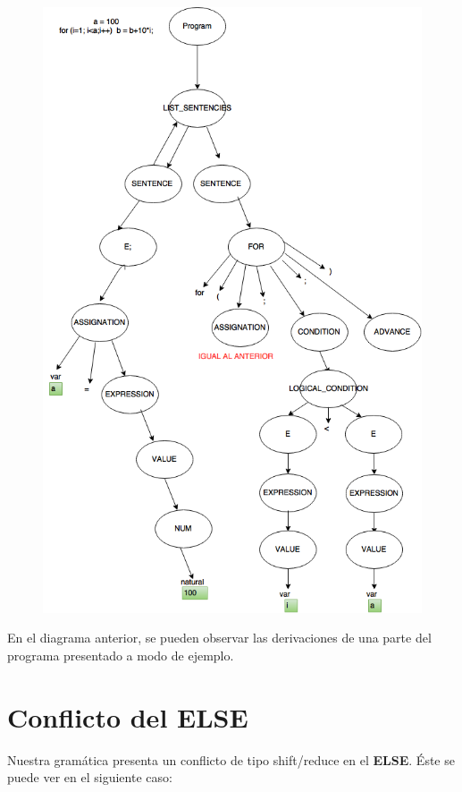 \documentclass[10pt,a4paper]{article}
\begin{document}
\begin{figure}[H]
\begin{center}
\includegraphics[scale=0.7]{imgs/ejemploGramatica.png}
\end{center}
\end{figure}

En el diagrama anterior, se pueden observar las derivaciones de una parte del programa presentado a modo de ejemplo.

\section{Conflicto del ELSE}
Nuestra gramática presenta un conflicto de tipo shift/reduce en el \textbf{ELSE}. Éste se puede ver en el siguiente caso:
\end{document}
